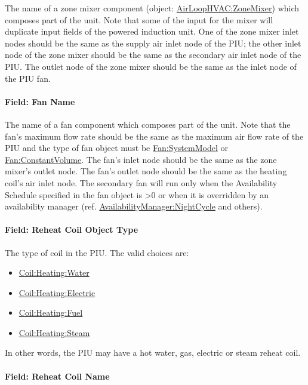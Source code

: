 The name of a zone mixer component (object: \hyperref[airloophvaczonemixer]{AirLoopHVAC:ZoneMixer}) which composes part of the unit. Note that some of the input for the mixer will duplicate input fields of the powered induction unit. One of the zone mixer inlet nodes should be the same as the supply air inlet node of the PIU; the other inlet node of the zone mixer should be the same as the secondary air inlet node of the PIU. The outlet node of the zone mixer should be the same as the inlet node of the PIU fan.

\paragraph{Field: Fan Name}\label{field-fan-name-1}

The name of a fan component which composes part of the unit. Note that the fan's maximum flow rate should be the same as the maximum air flow rate of the PIU and the type of fan object must be \hyperref[fansystemmodel]{Fan:SystemModel} or \hyperref[fanconstantvolume]{Fan:ConstantVolume}. The fan's inlet node should be the same as the zone mixer's outlet node. The fan's outlet node should be the same as the heating coil's air inlet node. The secondary fan will run only when the Availability Schedule specified in the fan object is >0 or when it is overridden by an availability manager (ref. \hyperref[availabilitymanagernightcycle]{AvailabilityManager:NightCycle} and others).

\paragraph{Field: Reheat Coil Object Type}\label{field-reheat-coil-object-type-3}

The type of coil in the PIU. The valid choices are:

\begin{itemize}
\item
  \hyperref[coilheatingwater]{Coil:Heating:Water}
\item
  \hyperref[coilheatingelectric]{Coil:Heating:Electric}
\item
  \hyperref[coilheatinggas-000]{Coil:Heating:Fuel}
\item
  \hyperref[coilheatingsteam]{Coil:Heating:Steam}
\end{itemize}

In other words, the PIU may have a hot water, gas, electric or steam reheat coil.

\paragraph{Field: Reheat Coil Name}\label{field-reheat-coil-name-3}

